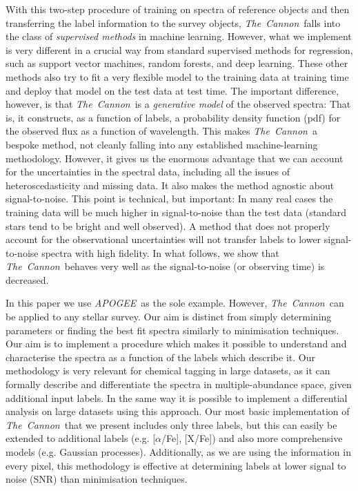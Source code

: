 \documentclass[12pt, preprint]{aastex}
\newcommand{\tc}{\textsl{The~Cannon}}
\newcommand{\apogee}{\textsl{APOGEE}}
\begin{document}
With this two-step procedure of training on spectra of reference objects and then transferring the label information to the survey objects, \tc\ falls into the class of \emph{supervised methods} in machine learning. 
However, what we implement is very different in a crucial way from standard supervised methods for regression, such as support vector machines, random forests, and deep learning.
These other methods also try to fit a very flexible model to the training data at training time
and deploy that model on the test data at test time.
The important difference, however, is that \tc\ is a \emph{generative model} of the observed spectra:
That is, it constructs, as a function of labels, a probability density function (pdf) for the observed
flux as a function of wavelength. 
This makes \tc\ a bespoke method, not cleanly falling into any established machine-learning methodology.
However, it gives us the enormous advantage that we can account for the uncertainties in the spectral data,
including all the issues of heteroscedasticity and missing data.
It also makes the method agnostic about signal-to-noise.
This point is technical, but important:
In many real cases the training data will be much higher in signal-to-noise than the test data
(standard stars tend to be bright and well observed).
A method that does not properly account for the observational uncertainties will not transfer labels to lower signal-to-noise spectra with high fidelity.
In what follows, we show that \tc\ behaves very well as the signal-to-noise (or observing time) is decreased.

In this paper we use \apogee\ as the sole example. 
However, \tc\ can be applied to any stellar survey.  
Our aim is distinct from simply determining parameters or finding the best fit spectra similarly to minimisation techniques. 
Our aim is to implement a procedure which makes it possible to understand and characterise the spectra as a function of the labels which describe it.  
Our methodology is very relevant for chemical tagging in large datasets, as it can formally describe and differentiate the spectra in multiple-abundance space, given additional input labels.
In the same way it is possible to implement a differential analysis on large datasets using this approach. 
Our most basic implementation of \tc\ that we present includes only three labels, but this can easily be extended to additional labels  (e.g. [$\alpha$/Fe], [X/Fe]) and also more comprehensive models (e.g. Gaussian processes). 
Additionally, as we are using the information in every pixel, this methodology is effective at determining labels at lower signal to noise (SNR) than minimisation techniques.%
\end{document}
